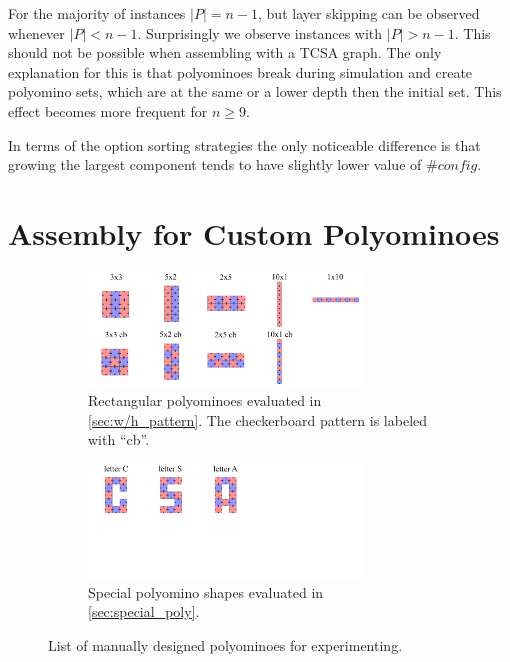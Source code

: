 For the majority of instances $|P| = n-1$, but layer skipping can be observed whenever $|P| < n-1$.
Surprisingly we observe instances with $|P| > n-1$.
This should not be possible when assembling with a TCSA graph.
The only explanation for this is that polyominoes break during simulation and create polyomino sets, which are at the same or a lower depth then the initial set.
This effect becomes more frequent for $n \geq 9$.

In terms of the option sorting strategies the only noticeable difference is that growing the largest component tends to have slightly lower value of $\#\textit{config}$.



\section{Assembly for Custom Polyominoes}
\label{sec:AFTS}

\begin{figure}
	\centering
	\begin{subfigure}[b]{\textwidth}
		\centering
		\includegraphics[width=0.8\textwidth]{figures/AFTS_cb_shapes.pdf}
		\caption{Rectangular polyominoes evaluated in \ref{sec:w/h_pattern}. The checkerboard pattern is labeled with ``cb''. \hfill}
		\label{fig:AFTS_cb_shapes}
	\end{subfigure}
	\begin{subfigure}[b]{\textwidth}
		\centering
		\includegraphics[width=0.8\textwidth]{figures/AFTS_sp_shapes.pdf}
		\caption{Special polyomino shapes evaluated in \autoref{sec:special_poly}.}
		\label{fig:AFTS_sp_shapes}
	\end{subfigure}
	\caption[List of manually designed polyominoes for experimenting]{List of manually designed polyominoes for experimenting.}
	\label{fig:AFTS_shapes}
\end{figure}


